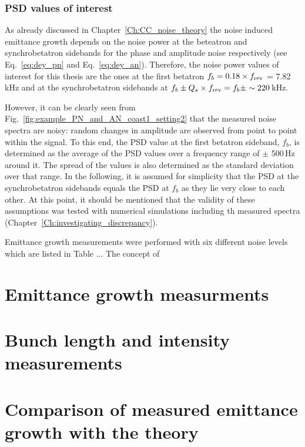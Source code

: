 \subsubsection*{PSD values of interest}
As already discussed in Chapter~\ref{Ch:CC_noise_theory} the noise induced emittance growth depends on the noise power at the beteatron and synchrobetatron sidebands for the phase and amplitude noise respectively (see Eq.~\eqref{eq:dey_pn} and Eq.~\eqref{eq:dey_an}). Therefore, the noise power values of interest for this thesis are the ones at the first betatron $f_b = 0.18 \times {f_\mathrm{rev}}$ = 7.82\,kHz and at the synchrobetatron sidebands at $f_b \pm {Q_s} \times {f_\mathrm{rev}}  = f_b \pm  \sim 220$\,kHz. 


However, it can be clearly seen from Fig.~\ref{fig:example_PN_and_AN_coast1_setting2} that the measured noise spectra are noisy: random changes in amplitude are observed from point to point within the signal. To this end, the PSD value at the first betatron sideband, $f_b$, is determined as the average of the PSD values over a frequency range of $\pm$ 500\,Hz around it. The spread of the values is also determined as the standard deviation over that range. In the following, it is assumed for simplicity that the PSD at the synchrobetatron sidebands equals the PSD at $f_b$ as they lie very close to each other. At this point, it should be mentioned that the validity of these assumptions was tested with numerical simulations including th measured spectra (Chapter~\ref{Ch:investigating_discrepancy}).





Emittance growth measurements were performed with six different noise levels which are listed in Table ... The concept of 

\section{Emittance growth measurments}\label{sec:emit_growth_meas_2018}


\section{Bunch length and intensity measurements}\label{sec:bunch_length_intensity_meas_2018}

\section{Comparison of measured emittance growth with the theory}\label{sec:meas_2018_vs_theory}

